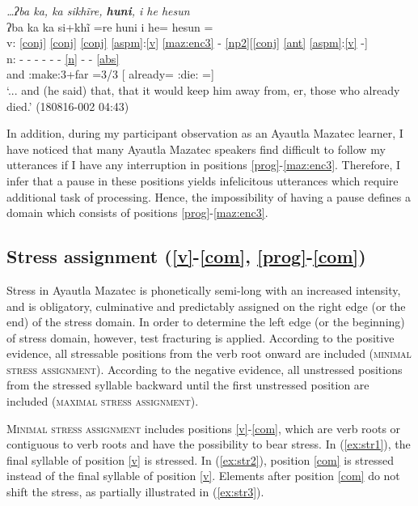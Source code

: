 \documentclass[output=paper]{langscibook}
\begin{document}
\ex \label{ex:p5} \textit{…ʔba\1 \ssn{}ka\2, \ssn{}ka\2 si\1\st{}khĩ\2re\1, \textbf{hu\1ni\2}, \xy{}i\2 he\2 he\2\st{}sun\4\1}\\
 \gllll {} ʔba\1 \ssn{}ka\2 \ssn{}ka\2 si\1+khĩ\2{} =re\1 hu\1ni\2 \xy{}i\2 he\2\ff= he\2sun\4 =\1\\
 v: \ref{conj} \ref{conj} \ref{conj} \ref{aspm}:\ref{v} \ref{maz:enc3} - \ref{np2}[\ref{conj} \ref{ant} \ref{aspm}:\ref{v} -]\\
 n: - - - - - - \ref{n} - - \ref{abs}\\
{} and \Sub{} \Sub{} \Pot:make:3+far =3/3 \Fill{} [\Rel{} already= \Pfv:die:\Pl{} =\Abst{}]\\
\glt `... and (he said) that, that it would keep him away from, er, those who already died.' (180816-002 04:43)

\z
\z

In addition, during my participant observation as an Ayautla Mazatec learner, I have noticed that many Ayautla Mazatec speakers find difficult to follow my utterances if I have any interruption in positions \ref{prog}-\ref{maz:enc3}. %
Therefore, I infer that a pause in these positions yields infelicitous utterances which require additional task of processing.
Hence, the impossibility of having a pause defines a domain which consists of positions \ref{prog}-\ref{maz:enc3}.

\subsection{Stress assignment (\ref{v}-\ref{com}, \ref{prog}-\ref{com})}\label{sec:d:stress}
Stress in Ayautla Mazatec is phonetically semi-long with an increased intensity, and is obligatory, culminative and predictably assigned on the right edge (or the end) of the stress domain. In order to determine the left edge (or the beginning) of stress domain, however, test fracturing is applied. According to the positive evidence, all stressable positions from the verb root onward are included (\textsc{minimal stress assignment}). According to the negative evidence, all unstressed positions from the stressed syllable backward until the first unstressed position are included (\textsc{maximal stress assignment}).

\textsc{Minimal stress assignment} includes positions \ref{v}-\ref{com}, which are verb roots or contiguous to verb roots and have the possibility to bear stress. In (\ref{ex:str1}), the final syllable of position \ref{v} is stressed. In (\ref{ex:str2}), position \ref{com} is stressed instead of the final syllable of position \ref{v}. Elements after  position \ref{com} do not shift the stress, as partially illustrated in (\ref{ex:str3}).
\end{document}
